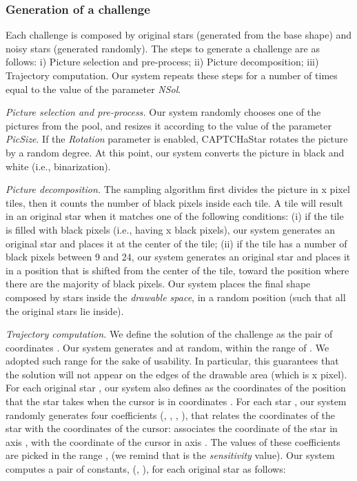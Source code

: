 \documentclass[conference]{IEEEtran}
\begin{document}
\subsubsection{Generation of a challenge}
Each challenge is composed by original stars (generated from the base shape) and noisy stars (generated randomly).
The steps to generate a challenge are as follows:
i) Picture selection and pre-process; ii) Picture decomposition; iii) Trajectory computation. Our system repeats these steps for a number of times equal to the value of the parameter \textit{NSol}.

\noindent\textit{Picture selection and pre-process.}
Our system randomly chooses one of the pictures from the pool, and resizes it according to the value of the parameter \textit{PicSize}.
If the \textit{Rotation} parameter is enabled, CAPTCHaStar rotates the picture by a random degree.
At this point, our system converts the picture in black and white (i.e., binarization). 

\noindent\textit{Picture decomposition.}
The sampling algorithm first divides the picture in x pixel tiles, then it counts the number of black pixels inside each tile. 
A tile will result in an original star when it matches one of the following conditions:
(i) if the tile is filled with black pixels (i.e., having x black pixels), our system generates an original star and places it at the center of the tile; (ii) if the tile has a number of black pixels between 9 and 24, our system generates an original star and places it in a position that is shifted from the center of the tile, toward the position where there are the majority of black pixels.
Our system places the final shape composed by stars inside the \textit{drawable space}, in a random position (such that all the original stars lie inside).


\noindent\textit{Trajectory computation.}
We define the solution  of the challenge as the pair of coordinates .
Our system generates  and  at random, within the range of .
We adopted such range for the sake of usability.
In particular, this guarantees that the solution will not appear on the edges of the drawable area (which is x pixel).
For each original star , our system also defines  as the coordinates of the position that the star  takes when the cursor is in coordinates .  For each star , our system randomly generates four coefficients (, , , ),
that relates the coordinates of the star with the coordinates of the cursor:  associates the coordinate of the star  in axis , with the coordinate of the cursor in axis .
The values of these coefficients are picked in the range ,  (we remind that  is the \textit{sensitivity} value).
Our system computes a pair of constants, (, ), for each original star  as follows:
\end{document}
